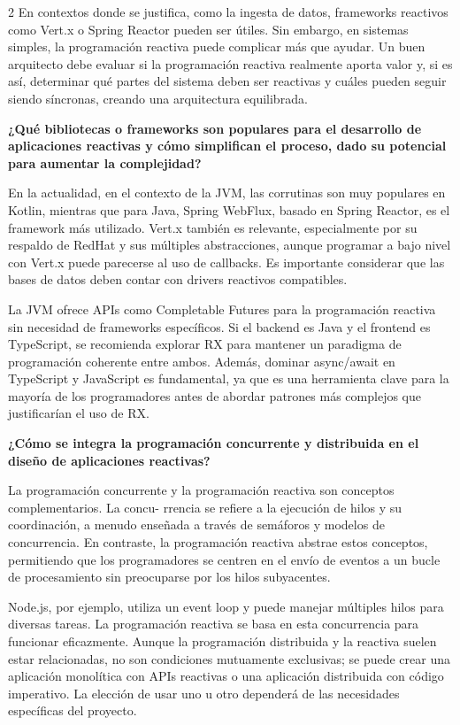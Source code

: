 \documentclass[12pt,spanish,Letterpaper,openany]{book}
\begin{document}
\begin {multicols}{2}
En contextos donde se justifica, como la ingesta de datos, frameworks reactivos como Vert.x o Spring Reactor pueden ser útiles. Sin embargo, en sistemas simples, la programación reactiva puede complicar más que ayudar. Un buen arquitecto debe evaluar si la programación reactiva realmente aporta valor y, si es así, determinar qué partes del sistema deben ser reactivas y cuáles pueden seguir siendo síncronas, creando una arquitectura equilibrada.

\textbf{¿Qué bibliotecas o frameworks son populares para el desarrollo de aplicaciones reactivas y cómo simplifican el proceso, dado su potencial para aumentar la complejidad?}

En la actualidad, en el contexto de la JVM, las corrutinas son muy populares en Kotlin, mientras que para Java, Spring WebFlux, basado en Spring Reactor, es el framework más utilizado. Vert.x también es relevante, especialmente por su respaldo de RedHat y sus múltiples abstracciones, aunque programar a bajo nivel con Vert.x puede parecerse al uso de callbacks. Es importante considerar que las bases de datos deben contar con drivers reactivos compatibles.

La JVM ofrece APIs como Completable Futures para la programación reactiva sin necesidad de frameworks específicos. Si el backend es Java y el frontend es TypeScript, se recomienda explorar RX para mantener un paradigma de programación coherente entre ambos. Además, dominar async/await en TypeScript y JavaScript es fundamental, ya que es una herramienta clave para la mayoría de los programadores antes de abordar patrones más complejos que justificarían el uso de RX.

\bigskip
\bigskip
\bigskip

\textbf{¿Cómo se integra la programación concurrente y distribuida en el diseño de aplicaciones reactivas?}

La programación concurrente y la programación reactiva son conceptos complementarios. La concu-
rrencia se refiere a la ejecución de hilos y su coordinación, a menudo enseñada a través de semáforos y modelos de concurrencia. En contraste, la programación reactiva abstrae estos conceptos, permitiendo que los programadores se centren en el envío de eventos a un bucle de procesamiento sin preocuparse por los hilos subyacentes.

Node.js, por ejemplo, utiliza un event loop y puede manejar múltiples hilos para diversas tareas. La programación reactiva se basa en esta concurrencia para funcionar eficazmente. Aunque la programación distribuida y la reactiva suelen estar relacionadas, no son condiciones mutuamente exclusivas; se puede crear una aplicación monolítica con APIs reactivas o una aplicación distribuida con código imperativo. La elección de usar uno u otro dependerá de las necesidades específicas del proyecto.


\end{multicols}
\end{document}
